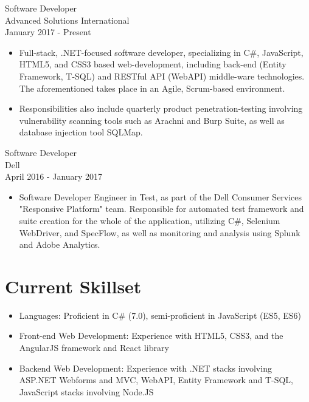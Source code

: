 \documentclass[11pt]{res} %
\begin{document}
\begin{resume}
Software Developer \\
Advanced Solutions International \\
January 2017 - Present
\vspace{0.2in}
   \begin{itemize} \itemsep -2pt  %
   \item Full-stack, .NET-focused software developer, specializing in C\#, JavaScript, HTML5, and CSS3 based web-development, including back-end (Entity Framework, T-SQL) and RESTful API (WebAPI) middle-ware technologies. The aforementioned takes place in an Agile, Scrum-based environment.
    \item Responsibilities also include quarterly product penetration-testing involving vulnerability scanning tools such as Arachni and Burp Suite, as well as database injection tool SQLMap.
 \end{itemize}

 Software Developer \\
Dell \\
April 2016 - January 2017
\vspace{0.2in}
   \begin{itemize} \itemsep -2pt  %
   \item Software Developer Engineer in Test, as part of the Dell Consumer Services "Responsive Platform" team. Responsible for automated test framework and suite creation for the whole of the application, utilizing C\#, Selenium WebDriver, and SpecFlow, as well as monitoring and analysis using Splunk and Adobe Analytics.
 \end{itemize}

\section{Current Skillset} 
 
   \begin{itemize} \itemsep -2pt  %
   \item Languages: Proficient in C\# (7.0), 
semi-proficient in JavaScript (ES5, ES6)
\\
   \item Front-end Web Development: Experience with HTML5, CSS3, and the AngularJS framework and React library
\\
    \item Backend Web Development: Experience with .NET stacks involving ASP.NET Webforms and MVC, WebAPI, Entity Framework and T-SQL, JavaScript stacks involving Node.JS
 \end{itemize}
 

\end{resume}
\end{document}
